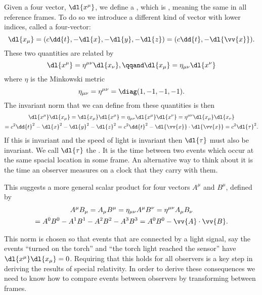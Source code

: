 \documentclass[fleqn]{NotesClass}
\begin{document}
    Given a four vector, \(\dl{x^\mu}\), we define a , which is , meaning the same in all reference frames.
    To do so we introduce a different kind of vector with lower indices, called a  four-vector:
    \begin{equation}
        \dl{x_\mu} = (c\dd{t}, -\dl{x}, -\dl{y}, -\dl{z}) = (c\dd{t}, -\dl{\vv{x}}).
    \end{equation}
    These two quantities are related by
    \begin{equation}
        \dl{x^\mu} = \eta^{\mu\nu}\dl{x_\nu}, \qqand \dl{x_\mu} = \eta_{\mu\nu}\dl{x^\nu}
    \end{equation}
    where \(\eta\) is the Minkowski metric
    \begin{equation}
        \eta_{\mu\nu} = \eta^{\mu\nu} = \diag(1, -1, -1, -1).
    \end{equation}   
    The invariant norm that we can define from these quantities is then
    \begin{multline}
        \dl{x^\mu}\dl{x_\mu} = \dl{x_\mu}\dl{x^\mu} = \eta_{\mu\nu}\dl{x^\mu}\dl{x^\nu} = \eta^{\mu\nu}\dl{x_\mu}\dl{x_\nu}\\
        = c^2\dd{t}^2 - \dl{x}^2 - \dl{y}^2 - \dl{z}^2 = c^2\dd{t}^2 - \dl{\vv{x}} \cdot \dl{\vv{x}} = c^2\dl{\tau}^2.
    \end{multline}
    If this is invariant and the speed of light is invariant then \(\dl{\tau}\) must also be invariant.
    We call \(\dl{\tau}\) the .
    It is the time between two events which occur at the same spacial location in some frame.
    An alternative way to think about it is the time an observer measures on a clock that they carry with them.
    
    This suggests a more general scalar product for four vectors \(A^\mu\) and \(B^\mu\), defined by
    \begin{multline}
        A^\mu B_\mu = A_\mu B^\mu = \eta_{\mu\nu}A^\mu B^\nu = \eta^{\mu\nu} A_\mu B_\nu\\
        = A^0B^0 - A^1B^1 - A^2B^2 - A^3B^3 = A^0B^0 - \vv{A} \cdot \vv{B}.
    \end{multline}
    
    This norm is chosen so that events that are connected by a light signal, say the events \enquote{turned on the torch} and \enquote{the torch light reached the sensor} have \(\dl{x^\mu}\dl{x_\mu} = 0\).
    Requiring that this holds for all observers is a key step in deriving the results of special relativity.
    In order to derive these consequences we need to know how to compare events between observers by transforming between frames.
    
\end{document}

